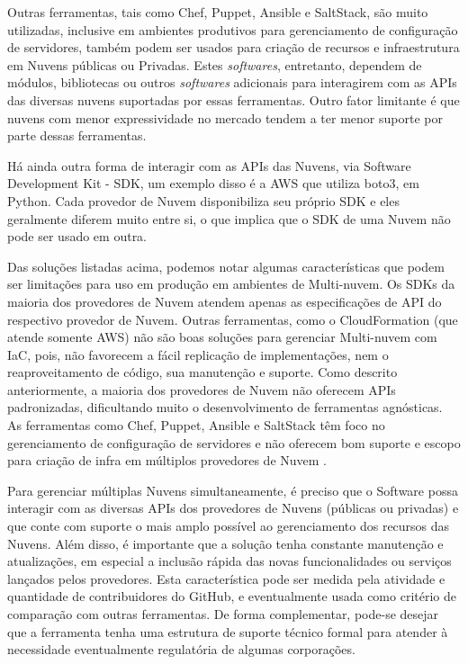 \documentclass[12pt]{article}
\begin{document}
	Outras ferramentas, tais como Chef, Puppet, Ansible e SaltStack, são muito utilizadas, inclusive em ambientes produtivos para gerenciamento de configuração de servidores, também podem ser usados para criação de recursos e infraestrutura em Nuvens públicas ou Privadas. Estes \textit{softwares}, entretanto, dependem de módulos, bibliotecas ou outros \textit{softwares} adicionais para interagirem com as APIs das diversas nuvens suportadas por essas ferramentas. Outro fator limitante é que nuvens com menor expressividade no mercado tendem a ter menor suporte por parte dessas ferramentas.
	
	Há ainda outra forma de interagir com as APIs das Nuvens, via Software Development Kit - SDK, um exemplo disso é a AWS que utiliza boto3, em Python. Cada provedor de Nuvem disponibiliza seu próprio SDK e eles geralmente diferem muito entre si, o que implica que o SDK de uma Nuvem não pode ser usado em outra.
	
	Das soluções listadas acima, podemos notar algumas características que podem ser limitações para uso em produção em ambientes de Multi-nuvem. Os SDKs da maioria dos provedores de Nuvem atendem apenas as especificações de API do respectivo provedor de Nuvem. Outras ferramentas, como o CloudFormation (que atende somente AWS) não são boas soluções para gerenciar Multi-nuvem com IaC, pois, não favorecem a fácil replicação de implementações, nem o reaproveitamento de código, sua manutenção e suporte. Como descrito anteriormente, a maioria dos provedores de Nuvem não oferecem APIs padronizadas, dificultando muito o desenvolvimento de ferramentas agnósticas. As ferramentas como Chef, Puppet, Ansible e SaltStack têm foco no gerenciamento de configuração de servidores e não oferecem bom suporte e escopo para criação de infra em múltiplos provedores de Nuvem \cite{Morris:2016}.
	
	Para gerenciar múltiplas Nuvens simultaneamente, é preciso que o Software possa interagir com as diversas APIs dos provedores de Nuvens (públicas ou privadas) e que conte com suporte o mais amplo possível ao gerenciamento dos recursos das Nuvens. Além disso, é importante que a solução tenha constante manutenção e atualizações, em especial a inclusão rápida das novas funcionalidades ou serviços lançados pelos provedores. Esta característica pode ser medida pela atividade e quantidade de contribuidores do GitHub, e eventualmente usada como critério de comparação com outras ferramentas. De forma complementar, pode-se desejar que a ferramenta tenha uma estrutura de suporte técnico formal para atender à necessidade eventualmente regulatória de algumas corporações.
	
\end{document}

